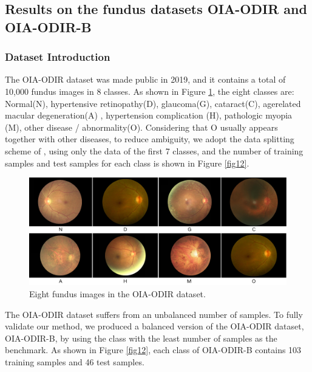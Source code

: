 \documentclass[10pt]{article} %
\begin{document}
\subsection{Results on the fundus datasets OIA-ODIR and OIA-ODIR-B\label{B.6}}

\subsubsection{Dataset Introduction}
The OIA-ODIR dataset \cite {paper109} was made public in 2019, and it contains a total of 10,000 fundus images in 8 classes. As shown in Figure \ref{fig30}, the eight classes are: Normal(N), hypertensive retinopathy(D), glaucoma(G), cataract(C), agerelated macular degeneration(A) , hypertension complication (H), pathologic myopia (M), other disease / abnormality(O). Considering that O usually appears together with other diseases, to reduce ambiguity, we adopt the data splitting scheme of \cite {paper110}, using only the data of the first 7 classes, and the number of training samples and test samples for each class is shown in Figure \ref{fig12}.

\begin{figure}[h]
\begin{center}
\includegraphics[width=1\columnwidth]{fig30}
\vskip -0.07in
\caption{Eight fundus images in the OIA-ODIR dataset.}
\label{fig30}
\end{center}
\vskip -0.1in
\end{figure}


The OIA-ODIR dataset suffers from an unbalanced number of samples. To fully validate our method, we produced a balanced version of the OIA-ODIR dataset, OIA-ODIR-B, by using the class with the least number of samples as the benchmark. As shown in Figure \ref{fig12}, each class of OIA-ODIR-B contains 103 training samples and 46 test samples.
\end{document}
